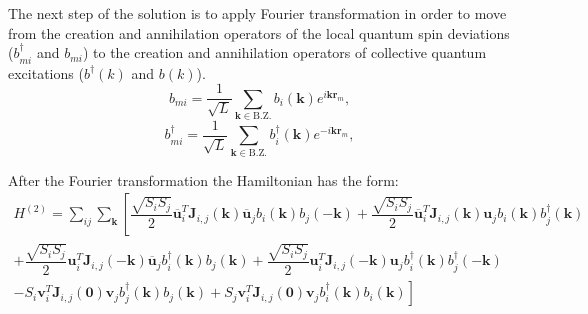 \documentclass[a4paper,12pt]{article}
\begin{document}
        The next step of the solution is to apply Fourier transformation in order to move from the creation and annihilation operators 
        of the local quantum spin deviations ($b^{\dag}_{mi}$ and $b_{mi}$) 
        to the creation and annihilation operators of collective quantum excitations ($b^{\dag}(k)$ and $b(k)$).
        \begin{equation}
            b_{mi} = \dfrac{1}{\sqrt{L}}\sum_{\boldsymbol{k} \in \text{B.Z.}} b_i(\boldsymbol{k})e^{i\boldsymbol{k}\boldsymbol{r}_m},
        \end{equation}
        \begin{equation}
            b^{\dag}_{mi} = \dfrac{1}{\sqrt{L}}\sum_{\boldsymbol{k} \in \text{B.Z.}} b^{\dag}_i(\boldsymbol{k})e^{-i\boldsymbol{k}\boldsymbol{r}_m},
        \end{equation}

        After the Fourier transformation the Hamiltonian has the form:
        \begin{multline}
            H^{(2)} = \sum_{ij}\sum_{\boldsymbol{k}}\left[\dfrac{\sqrt{S_i S_j}}{2}\overline{\boldsymbol{u}}^T_i\boldsymbol{J}_{i,j}(\boldsymbol{k})\overline{\boldsymbol{u}}_jb_{i}(\boldsymbol{k})b_{j}(-\boldsymbol{k}) +
            \dfrac{\sqrt{S_i S_j}}{2} \overline{\boldsymbol{u}}^T_i\boldsymbol{J}_{i,j}(\boldsymbol{k})\boldsymbol{u}_j b_{i}(\boldsymbol{k})b^{\dag}_{j}(\boldsymbol{k})\right. \\+ 
            \dfrac{\sqrt{S_i S_j}}{2}\boldsymbol{u}^T_i\boldsymbol{J}_{i,j}(-\boldsymbol{k})\overline{\boldsymbol{u}}_jb^{\dag}_{i}(\boldsymbol{k})b_{j}(\boldsymbol{k}) +
            \dfrac{\sqrt{S_i S_j}}{2}\boldsymbol{u}^T_i\boldsymbol{J}_{i,j}(-\boldsymbol{k})\boldsymbol{u}_jb^{\dag}_{i}(\boldsymbol{k})b^{\dag}_{j}(-\boldsymbol{k}) \\-
            \left.S_i\boldsymbol{v}^T_i\boldsymbol{J}_{i,j}(\boldsymbol{0})\boldsymbol{v}_jb^{\dag}_{j}(\boldsymbol{k})b_{j}(\boldsymbol{k}) + 
            S_j\boldsymbol{v}^T_i\boldsymbol{J}_{i,j}(\boldsymbol{0})\boldsymbol{v}_jb^{\dag}_{i}(\boldsymbol{k})b_{i}(\boldsymbol{k})\right]
        \end{multline}
\end{document}
